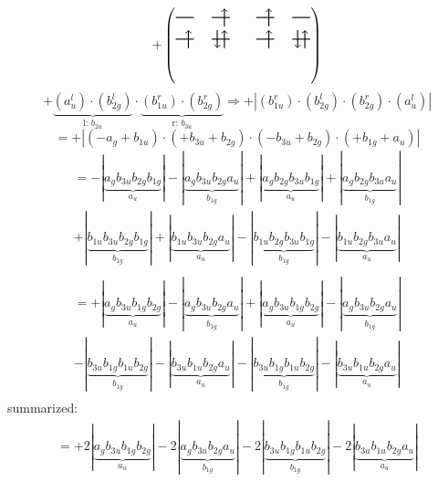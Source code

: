 \documentclass{article}
\begin{document}
\[+\left(\begin{tikzpicture}
    \draw[thick] (0,0) -- (0.5,0); %
    \draw[thick] (1,0) -- (1.5,0); %
    \draw[thick] (0,-0.6) -- (0.5,-0.6); %
    \draw[thick] (1,-0.6) -- (1.5,-0.6); %
\draw[->, thick] (1.35, -0.25) -- (1.35, 0.25); 
\draw[-> , thick] (0.35, -0.85) -- (0.35, -0.35); 
 \draw[-> , thick] (1.35, -0.85) -- (1.35, -0.35); 
\draw[<- , thick] (1.15, -0.85) -- (1.15, -0.35); 
\end{tikzpicture}\qquad \begin{tikzpicture}
    \draw[thick] (0,0) -- (0.5,0); %
    \draw[thick] (1,0) -- (1.5,0); %
    \draw[thick] (0,-0.6) -- (0.5,-0.6); %
    \draw[thick] (1,-0.6) -- (1.5,-0.6); %
\draw[->, thick] (0.35, -0.25) -- (0.35, 0.25); 
\draw[-> , thick] (0.35, -0.85) -- (0.35, -0.35); 
 \draw[-> , thick] (1.35, -0.85) -- (1.35, -0.35); 
\draw[<- , thick] (1.15, -0.85) -- (1.15, -0.35); 
\end{tikzpicture}\right)\]$$+ \underbrace{(a_{u}^{l})\cdot (b_{2g}^{l})}_{\text{l: }b_{2u}}\cdot \underbrace{(b_{1u}^{r})\cdot (b_{2g}^{r})}_{\text{r: }b_{3u}}\Rightarrow +\left|(b_{1u}^{r}) \cdot (b_{2g}^{l}) \cdot (b_{2g}^{r}) \cdot (a_{u}^{l})\right|$$$$=+\left|(-a_{g}+b_{1u}) \cdot (+b_{3u}+b_{2g}) \cdot (-b_{3u}+b_{2g}) \cdot (+b_{1g}+a_{u})\right|$$\begin{multline*}
=-\left|\underbrace{a_{g} b_{3u} b_{2g} b_{1g}}_{a_{u}}\right|-\left|\underbrace{a_{g} b_{3u} b_{2g} a_{u}}_{b_{1g}}\right|+\left|\underbrace{a_{g} b_{2g} b_{3u} b_{1g}}_{a_{u}}\right|+\left|\underbrace{a_{g} b_{2g} b_{3u} a_{u}}_{b_{1g}}\right|\\
+\left|\underbrace{b_{1u} b_{3u} b_{2g} b_{1g}}_{b_{1g}}\right|+\left|\underbrace{b_{1u} b_{3u} b_{2g} a_{u}}_{a_{u}}\right|-\left|\underbrace{b_{1u} b_{2g} b_{3u} b_{1g}}_{b_{1g}}\right|-\left|\underbrace{b_{1u} b_{2g} b_{3u} a_{u}}_{a_{u}}\right|\\
\end{multline*}\begin{multline*}
=+\left|\underbrace{a_{g} b_{3u} b_{1g} b_{2g}}_{a_{u}}\right|-\left|\underbrace{a_{g} b_{3u} b_{2g} a_{u}}_{b_{1g}}\right|+\left|\underbrace{a_{g} b_{3u} b_{1g} b_{2g}}_{a_{u}}\right|-\left|\underbrace{a_{g} b_{3u} b_{2g} a_{u}}_{b_{1g}}\right|\\
-\left|\underbrace{b_{3u} b_{1g} b_{1u} b_{2g}}_{b_{1g}}\right|-\left|\underbrace{b_{3u} b_{1u} b_{2g} a_{u}}_{a_{u}}\right|-\left|\underbrace{b_{3u} b_{1g} b_{1u} b_{2g}}_{b_{1g}}\right|-\left|\underbrace{b_{3u} b_{1u} b_{2g} a_{u}}_{a_{u}}\right|\\
\end{multline*}summarized:\begin{multline*}
=+2\left|\underbrace{a_{g} b_{3u} b_{1g} b_{2g}}_{a_{u}}\right|-2\left|\underbrace{a_{g} b_{3u} b_{2g} a_{u}}_{b_{1g}}\right|-2\left|\underbrace{b_{3u} b_{1g} b_{1u} b_{2g}}_{b_{1g}}\right|-2\left|\underbrace{b_{3u} b_{1u} b_{2g} a_{u}}_{a_{u}}\right|\\
\end{multline*}\\ \\
\end{document}
